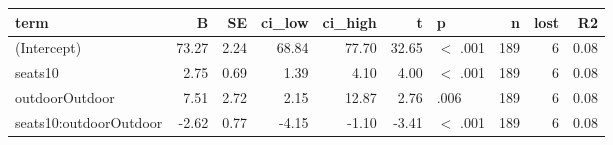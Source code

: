 \begin{tabular}{lrrrrrlrrr}
  \toprule
term & B & SE & ci\_low & ci\_high & t & p & n & lost & R2 \\ 
  \midrule
(Intercept) & 73.27 & 2.24 & 68.84 & 77.70 & 32.65 & $<$ .001 & 189 &   6 & 0.08 \\ 
  seats10 & 2.75 & 0.69 & 1.39 & 4.10 & 4.00 & $<$ .001 & 189 &   6 & 0.08 \\ 
  outdoorOutdoor & 7.51 & 2.72 & 2.15 & 12.87 & 2.76 & .006 & 189 &   6 & 0.08 \\ 
  seats10:outdoorOutdoor & -2.62 & 0.77 & -4.15 & -1.10 & -3.41 & $<$ .001 & 189 &   6 & 0.08 \\ 
   \bottomrule
\end{tabular}
